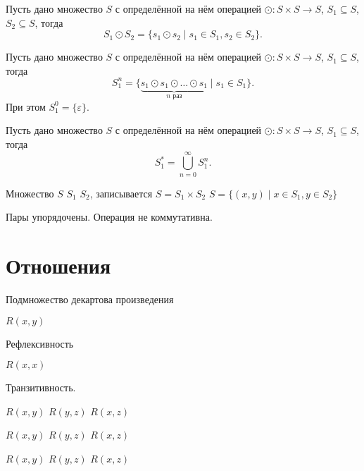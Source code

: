 \begin{definition}
    Пусть дано множество $S$ с определённой на нём операцией $\odot: S \times S \to S$, $S_1 \subseteq S$, $S_2 \subseteq S$, тогда
    \[S_1 \odot S_2 = \{ s_1 \odot s_2 \mid s_1 \in S_1, s_2 \in S_2\}.\]
\end{definition}

\begin{definition}
    Пусть дано множество $S$ с определённой на нём операцией $\odot: S \times S \to S$, $S_1 \subseteq S$, тогда
    \[S_1^n = \{ \underbrace{s_1 \odot s_1 \odot \dots \odot s_1}_{\text{$n$ раз}} \mid s_1 \in S_1\}.\]
    При этом $S_1^0 = \{\varepsilon\}$.
\end{definition}

\begin{definition}
    Пусть дано множество $S$ с определённой на нём операцией $\odot: S \times S \to S$, $S_1 \subseteq S$, тогда
    \[S_1^* = \bigcup_{n = 0}^{\infty} S_1^n.\]
\end{definition}

\begin{definition}
    Множество $S$ $S_1$ $S_2$, записывается $S = S_1 \times S_2$  $S = \{ (x,y) \mid x \in S_1, y \in S_2\}$  
\end{definition}

Пары упорядочены. Операция не коммутативна.

\section{Отношения}

Подмножество декартова произведения
\begin{definition}[Отношение]
    $R(x,y)$
\end{definition}

Рефлексивность
\begin{definition}
    $R(x,x)$
\end{definition}


Транзитивность.
\begin{definition}
    $R(x,y)$ $R(y,z)$ $R(x,z)$
\end{definition}

\begin{definition}
    $R(x,y)$ $R(y,z)$ $R(x,z)$
\end{definition}

\begin{definition}
    $R(x,y)$ $R(y,z)$ $R(x,z)$
\end{definition}
